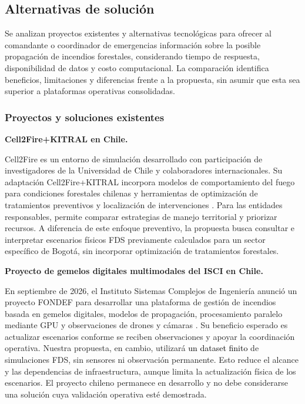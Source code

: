 \subsection{Alternativas de solución}
\label{sec:alternativas}

Se analizan proyectos existentes y alternativas tecnológicas para ofrecer al comandante o coordinador de emergencias información sobre la posible propagación de incendios forestales, considerando tiempo de respuesta, disponibilidad de datos y costo computacional. La comparación identifica beneficios, limitaciones y diferencias frente a la propuesta, sin asumir que esta sea superior a plataformas operativas consolidadas.

\subsubsection{Proyectos y soluciones existentes}

\textbf{Cell2Fire+KITRAL en Chile.}

Cell2Fire es un entorno de simulación desarrollado con participación de investigadores de la Universidad de Chile y colaboradores internacionales. Su adaptación Cell2Fire+KITRAL incorpora modelos de comportamiento del fuego para condiciones forestales chilenas y herramientas de optimización de tratamientos preventivos y localización de intervenciones \cite{vfpCell2FireChile}. Para las entidades responsables, permite comparar estrategias de manejo territorial y priorizar recursos. A diferencia de este enfoque preventivo, la propuesta busca consultar e interpretar escenarios físicos FDS previamente calculados para un sector específico de Bogotá, sin incorporar optimización de tratamientos forestales.

\textbf{Proyecto de gemelos digitales multimodales del ISCI en Chile.}

En septiembre de 2026, el Instituto Sistemas Complejos de Ingeniería anunció un proyecto FONDEF para desarrollar una plataforma de gestión de incendios basada en gemelos digitales, modelos de propagación, procesamiento paralelo mediante GPU y observaciones de drones y cámaras \cite{vfpISCI2026}. Su beneficio esperado es actualizar escenarios conforme se reciben observaciones y apoyar la coordinación operativa. Nuestra propuesta, en cambio, utilizará \textcolor{black}{un dataset finito} de simulaciones FDS, sin sensores ni observación permanente. Esto reduce el alcance y las dependencias de infraestructura, aunque limita la actualización física de los escenarios. El proyecto chileno permanece en desarrollo y no debe considerarse una solución cuya validación operativa esté demostrada.

